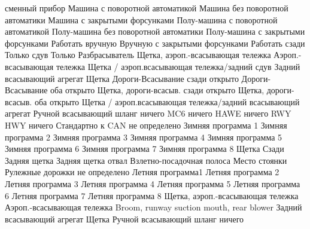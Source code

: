  {сменный прибор}
 {Машина с поворотной автоматикой}
 {Машина без поворотной автоматики}
 {Машина с закрытыми форсунками}
 {Полу-машина с поворотной автоматикой}
 {Полу-машина без поворотной автоматики}
 {Полу-машина с закрытыми форсунками}
 {Работать вручную}
 {Вручную с закрытыми форсунками}
 {Работать сзади}
 {Только сдув}
 {Только Разбрасыватель}
 {Щетка, аэроп.-всасывающая тележка}
 {Аэроп.-всасывающая тележка}
 {Щетка / аэроп.всасывающая тележка/задний сдув}
 {Задний всасывающий агрегат}
 {Щетка}
 {Дороги-Всасывание сзади открыто}
 {Дороги-Всасывание оба открыто}
 {Щетка, дороги-всасыв. сзади открыто}
 {Щетка, дороги-всасыв. оба открыто}
 {Щетка / аэроп.всасывающая тележка/задний всасывающий агрегат}
 {Ручной всасывающий шланг}
 {ничего}
 {MC6}
 {ничего}
 {HAWE}
 {ничего}
 {RWY}
 {HWY}
 {ничего}
 {Стандартно к CAN}
 {не определено}
 {Зимняя программа 1}
 {Зимняя программа 2}
 {Зимняя программа 3}
 {Зимняя программа 4}
 {Зимняя программа 5}
 {Зимняя программа 6}
 {Зимняя программа 7}
 {Зимняя программа 8}
 {Щетка}
 {Сзади}
 {Задняя щетка}
 {Задняя щетка отвал}
 {Взлетно-посадочная полоса}
 {Место стоянки}
 {Рулежные дорожки}
 {не определено}
 {Летняя программа1}
 {Летняя программа 2}
 {Летняя программа 3}
 {Летняя программа 4}
 {Летняя программа 5}
 {Летняя программа 6}
 {Летняя программа 7}
 {Летняя программа 8}
 {Щетка, аэроп.-всасывающая тележка}
 {Аэроп.-всасывающая тележка}
 {\red Broom, runway suction mouth, rear blower}
 {Задний всасывающий агрегат}
 {Щетка}
 {Ручной всасывающий шланг}
 {ничего}
